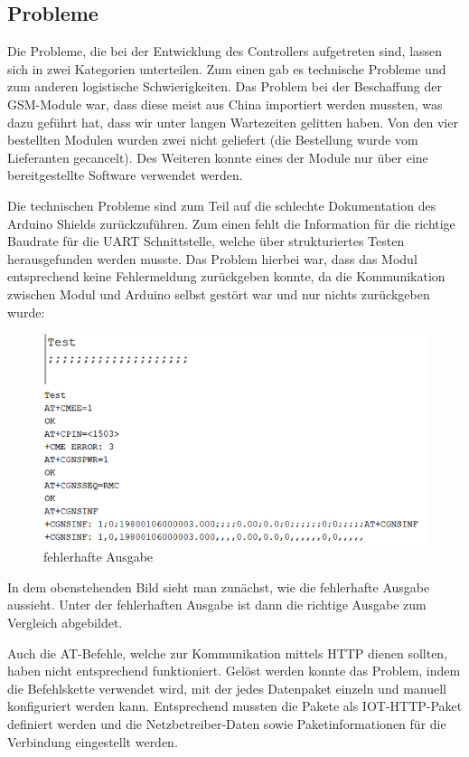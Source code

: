 \subsection{Probleme}
Die Probleme, die bei der Entwicklung des Controllers aufgetreten sind, lassen sich in zwei Kategorien unterteilen. Zum einen gab es technische Probleme und zum anderen logistische Schwierigkeiten.
Das Problem bei der Beschaffung der GSM-Module war, dass diese meist aus China importiert werden mussten, was dazu geführt hat, dass wir unter langen Wartezeiten gelitten haben. Von den vier bestellten Modulen wurden zwei nicht geliefert (die Bestellung wurde vom Lieferanten gecancelt). Des Weiteren konnte eines der Module nur über eine bereitgestellte Software verwendet werden.

Die technischen Probleme sind zum Teil auf die schlechte Dokumentation des Arduino Shields zurückzuführen. Zum einen fehlt die Information für die richtige Baudrate für die UART Schnittstelle, welche über strukturiertes Testen herausgefunden werden musste. Das Problem hierbei war, dass das Modul entsprechend keine Fehlermeldung zurückgeben konnte, da die Kommunikation zwischen Modul und Arduino selbst gestört war und nur nichts zurückgeben wurde:
\begin{figure} [H]
	\begin{center}
		\includegraphics[width=1\textwidth]{Bilder/Arduino_Probleme.png}
		\caption{fehlerhafte Ausgabe}
		\label{Arduinoproblem}
	\end{center}
\end{figure}
In dem obenstehenden Bild sieht man zunächst, wie die fehlerhafte Ausgabe aussieht. Unter der fehlerhaften Ausgabe ist dann die richtige Ausgabe zum Vergleich abgebildet.

Auch die AT-Befehle, welche zur Kommunikation mittels HTTP dienen sollten, haben nicht entsprechend funktioniert. Gelöst werden konnte das Problem, indem die Befehlskette verwendet wird, mit der jedes Datenpaket einzeln und manuell konfiguriert werden kann. Entsprechend mussten die Pakete als IOT-HTTP-Paket definiert werden und die Netzbetreiber-Daten sowie Paketinformationen für die Verbindung eingestellt werden.

